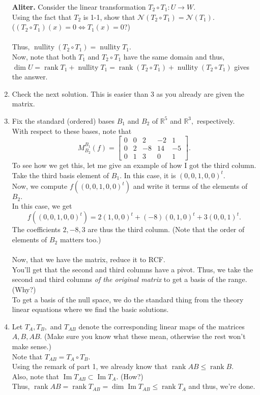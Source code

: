 \documentclass{article}
\newcommand{\rank}{\operatorname{rank}}
\renewcommand{\Im}{\operatorname{Im}}
\begin{document}
\begin{enumerate}
	\hrulefill

	\textbf{Aliter.} Consider the linear transformation $T_2\circ T_1:U \to W.$\\
	Using the fact that $T_2$ is 1-1, show that $\mathcal{N}(T_2\circ T_1) = \mathcal{N}(T_1).$\\
	($(T_2\circ T_1)(x) = 0 \iff T_1(x) = 0$?)\\~\\
	Thus, $\operatorname{nullity}(T_2\circ T_1) = \operatorname{nullity} T_1.$\\
	Now, note that both $T_1$ and $T_2\circ T_1$ have the same domain and thus, $\dim U = \rank T_1 + \operatorname{nullity} T_1 = \rank(T_2\circ T_1) + \operatorname{nullity}(T_2 \circ T_1)$ gives the answer.
	\item Check the next solution. This is easier than 3 as you already are given the matrix.
	\item Fix the standard (ordered) bases $B_1$ and $B_2$ of $\mathbb{R}^5$ and $\mathbb{R}^3,$ respectively.\\
	With respect to these bases, note that
	\[M^{B_1}_{B_2}(f) = \begin{bmatrix}
		0 & 0 & 2 & -2 & 1\\
		0 & 2 & -8 & 14 & -5\\
		0 & 1 & 3 & 0 & 1
	\end{bmatrix}.\]
	To see how we get this, let me give an example of how I got the third column.\\
	Take the third basis element of $B_1.$ In this case, it is $(0, 0, 1, 0, 0)^t.$\\
	Now, we compute $f((0, 0, 1, 0, 0)^t)$ and write it terms of the elements of $B_2.$\\
	In this case, we get
	\[f((0, 0, 1, 0, 0)^t) = 2(1, 0, 0)^t  + (-8)(0, 1, 0)^t + 3(0, 0, 1)^t.\]
	The coefficients $2, -8, 3$ are thus the third column. (Note that the order of elements of $B_2$ matters too.)\\~\\
	Now, that we have the matrix, reduce it to RCF.\\
	You'll get that the second and third columns have a pivot. Thus, we take the second and third columns \emph{of the original matrix} to get a basis of the range. \hfill (Why?)\\
	To get a basis of the null space, we do the standard thing from the theory linear equations where we find the basic solutions.
	\item Let $T_A, T_B,$ and $T_{AB}$ denote the corresponding linear maps of the matrices $A, B, AB.$ (Make sure you know what these mean, otherwise the rest won't make sense.) \\
	Note that $T_{AB} = T_A\circ T_B.$\\
	Using the remark of part 1, we already know that $\rank AB \le \rank B.$\\
	Also, note that $\Im T_{AB} \subset \Im T_A.$ \hfill (How?)\\
	Thus, $\rank AB = \rank T_{AB} = \dim \Im T_{AB} \le \rank T_{A}$ and thus, we're done.


\end{enumerate}
\end{document}
